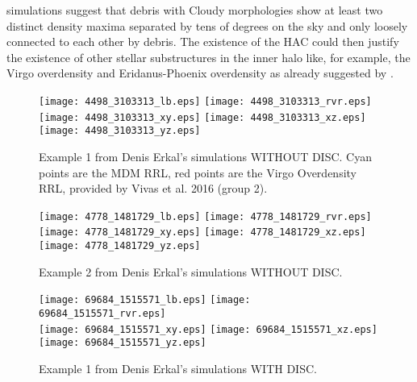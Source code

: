 \documentclass[useAMS,usenatbib]{mn2e}
\begin{document}
\citet{Bu05} simulations suggest that debris with Cloudy morphologies show at least two distinct density maxima separated by tens of degrees on the sky and only loosely connected to each other by debris. The existence of the HAC  could then justify the existence of other stellar substructures in the inner halo like, for example, the Virgo overdensity and  Eridanus-Phoenix overdensity as already suggested by \citet{Li2016}.

%



\appendix
\begin{figure*}
\hspace{-1.5cm}
\texttt{[image: 4498\_3103313\_lb.eps]}
\texttt{[image: 4498\_3103313\_rvr.eps]} \\
\vspace{-0.5cm}
\hspace{-1.0cm}
\texttt{[image: 4498\_3103313\_xy.eps]}
\texttt{[image: 4498\_3103313\_xz.eps]}
\texttt{[image: 4498\_3103313\_yz.eps]}
\caption{Example 1 from Denis Erkal's simulations WITHOUT DISC. Cyan points are the MDM RRL, red points are the Virgo Overdensity RRL, provided by Vivas et al. 2016 (group 2).}
\end{figure*}
\begin{figure*}
\hspace{-1.5cm}
\texttt{[image: 4778\_1481729\_lb.eps]}
\texttt{[image: 4778\_1481729\_rvr.eps]} \\
\vspace{-0.5cm}
\hspace{-1.0cm}
\texttt{[image: 4778\_1481729\_xy.eps]}
\texttt{[image: 4778\_1481729\_xz.eps]}
\texttt{[image: 4778\_1481729\_yz.eps]}
\caption{Example 2 from Denis Erkal's simulations WITHOUT DISC.}
\end{figure*}
\begin{figure*}
\hspace{-1.5cm}
\texttt{[image: 69684\_1515571\_lb.eps]}
\texttt{[image: 69684\_1515571\_rvr.eps]} \\
\vspace{-0.5cm}
\hspace{-1.0cm}
\texttt{[image: 69684\_1515571\_xy.eps]}
\texttt{[image: 69684\_1515571\_xz.eps]}
\texttt{[image: 69684\_1515571\_yz.eps]}
\caption{Example 1 from Denis Erkal's simulations WITH DISC. }
\end{figure*}
\end{document}

